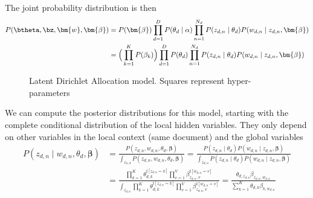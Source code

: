 The joint probability distribution is then
\[
  \begin{aligned}
    P(\btheta, \bz, \bm{w}, \bm{\beta})
    &= P(\bm{\beta})\prod_{d=1}^{D}P(\theta_{d}\mid \alpha)\prod_{n=1}^{N_{d}}P(z_{d,n}\mid \theta_{d})P(w_{d,n} \mid z_{d,n}, \bm{\beta})\\
    &= \Big( \prod_{k=1}^{K}P(\beta_{k}) \Big)\prod_{d=1}^{D}P(\theta_{d})\prod_{n=1}^{N_{d}}P(z_{d,n}\mid \theta_{d})P(w_{d,n} \mid z_{d,n}, \bm{\beta})
  \end{aligned}
\]

\begin{figure}[h!]
  \centering
  \caption{Latent Dirichlet Allocation model. Squares represent hyper-parameters}\label{fig:lda}
\end{figure}

We can compute the posterior distributions for this model, starting with the complete conditional distribution of the local hidden variables. They only depend on other variables in the local context (same document) and the global variables
\[
  \begin{aligned}
    P(z_{d,n} \mid w_{d,n}, \theta_{d}, \bm{\beta}) &= \frac{P(z_{d,n}, w_{d,n}, \theta_{d}, \bm{\beta})}{\int_{z_{n,d}}P(z_{d,n}, w_{d,n}, \theta_{d}, \bm{\beta})} = \frac{P(z_{d,n}\mid \theta_{d})P(w_{d,n}\mid z_{d,n},\bm{\beta})}{ \int_{z_{d,n}} P(z_{d,n}\mid \theta_{d})P(w_{d,n}\mid z_{d,n},\bm{\beta}) }\\
    &= \frac{ \prod_{k=1}^{K} \theta_{d,k}^{\mathbb{I}[z_{d,n}=k]} \prod_{v=1}^{V}\beta_{z_{d,n},v}^{\mathbb{I}[w_{d,n}=v]}}{ \int_{z_{d,n}}  \prod_{k=1}^{K} \theta_{d,k}^{\mathbb{I}[z_{d,n}=k]} \prod_{v=1}^{V}\beta_{z_{d,n},v}^{\mathbb{I}[w_{d,n}=v]}} = \frac{\theta_{d, z_{d,n}}\beta_{z_{d,n},w_{d,n}}}{ \sum_{k=1}^{K} \theta_{d, k}\beta_{k,w_{d,n}}}
  \end{aligned}
\]

